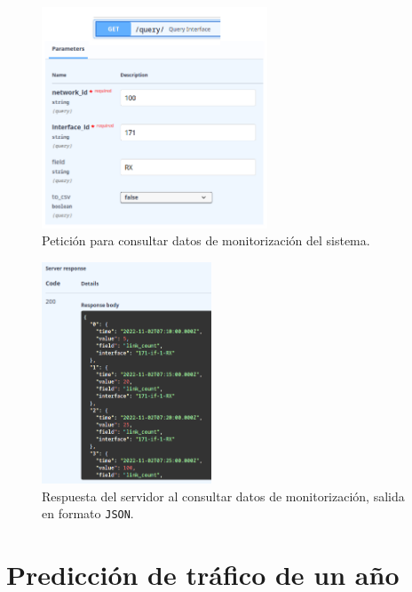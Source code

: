\documentclass[a4paper, oneside, 12pt]{book}
\begin{document}
	\pagebreak
	
	\begin{figure}[h!]
		\begin{center}
			\includegraphics[width=0.6\textwidth]{diag/parameters_query_1.png}
			\caption{Petición para consultar datos de monitorización del sistema.}
			\label{img: parameters query 1}
		\end{center}
	\end{figure}

	\begin{figure}[h!]
		\begin{center}
			\includegraphics[width=0.45\textwidth]{img/response_query_1.png}
			\caption{Respuesta del servidor al consultar datos de monitorización, salida en formato \texttt{JSON}.}
			\label{img: response query 1}
		\end{center}
	\end{figure}
	
	\pagebreak
	
	\section{Predicción de tráfico de un año}
	
\end{document}

